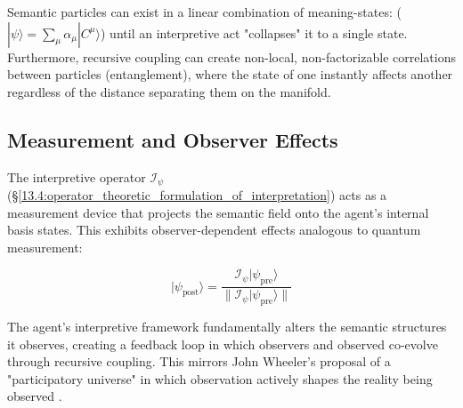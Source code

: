 Semantic particles can exist in a linear combination of meaning-states: (\(|\psi\rangle = \sum_\mu \alpha_\mu |C^\mu\rangle\)) until an interpretive act "collapses" it to a single state. Furthermore, recursive coupling can create non-local, non-factorizable correlations between particles (entanglement), where the state of one instantly affects another regardless of the distance separating them on the manifold.


\subsection{Measurement and Observer Effects}
\label{13.7.3:measurement_and_observer_effects}

The interpretive operator \(\mathcal{I}_{\psi}\) (\S\ref{13.4:operator_theoretic_formulation_of_interpretation}) acts as a measurement device that projects the semantic field onto the agent's internal basis states. This exhibits observer-dependent effects analogous to quantum measurement:

\begin{equation}
|\psi_{\text{post}}\rangle = \frac{\mathcal{I}_{\psi}|\psi_{\text{pre}}\rangle}{\|\mathcal{I}_{\psi}|\psi_{\text{pre}}\rangle\|}
\end{equation}

The agent's interpretive framework fundamentally alters the semantic structures it observes, creating a feedback loop in which observers and observed co-evolve through recursive coupling. This mirrors John Wheeler's proposal of a "participatory universe" in which observation actively shapes the reality being observed \autocite{Wheeler1990}.

